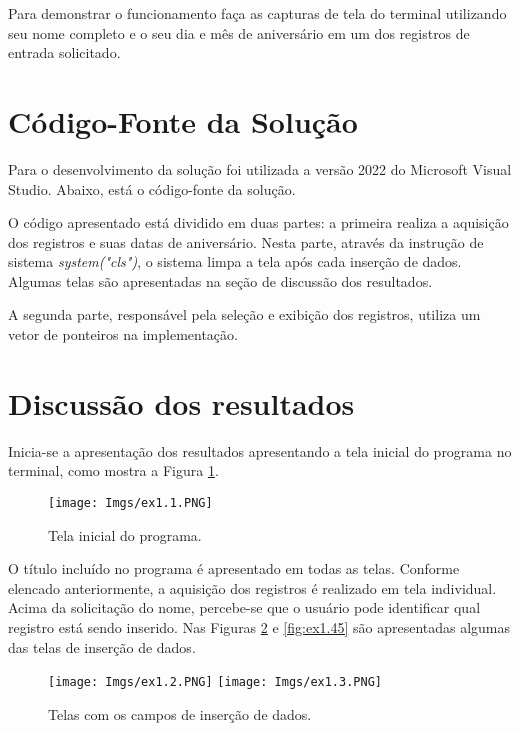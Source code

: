 \documentclass[
	12pt,				%
	openright,			%
	oneside,			%
	a4paper,			%
	chapter=TITLE,		%
	section=TITLE,		%
	english,			%
	french,				%
	spanish,			%
	brazil				%
	]{abntex2}
\begin{document}
	Para demonstrar o funcionamento faça as capturas de tela do terminal utilizando seu nome completo e o seu dia e mês de aniversário em um dos registros de entrada solicitado.

\section{Código-Fonte da Solução}

	Para o desenvolvimento da solução foi utilizada a versão 2022 do Microsoft Visual Studio. Abaixo, está o código-fonte da solução.

	

	O código apresentado está dividido em duas partes: a primeira realiza a aquisição dos registros e suas datas de aniversário. Nesta parte, através da instrução de sistema \emph{system("cls")}, o sistema limpa a tela após cada inserção de dados. Algumas telas são apresentadas na seção de discussão dos resultados.
	
	A segunda parte, responsável pela seleção e exibição dos registros, utiliza um vetor de ponteiros na implementação. 


\section{Discussão dos resultados}

	Inicia-se a apresentação dos resultados apresentando a tela inicial do programa no terminal, como mostra a Figura \ref{fig:ex1.1}.

	\begin{figure}[htpb]
		\centering
		\caption{Tela inicial do programa.}
		\texttt{[image: Imgs/ex1.1.PNG]}
		\label{fig:ex1.1}
	\end{figure}

	O título incluído no programa é apresentado em todas as telas. Conforme elencado anteriormente, a aquisição dos registros é realizado em tela individual. Acima da solicitação do nome, percebe-se que o usuário pode identificar qual registro está sendo inserido. Nas Figuras \ref{fig:ex1.23} e \ref{fig:ex1.45} são apresentadas algumas das telas de inserção de dados.

	\begin{figure}[htb]
		\begin{center}
			\caption{Telas com os campos de inserção de dados.}
			\label{fig:ex1.23}
			\texttt{[image: Imgs/ex1.2.PNG]} \quad
			\texttt{[image: Imgs/ex1.3.PNG]} \quad
		\end{center}
	\end{figure}
\end{document}
